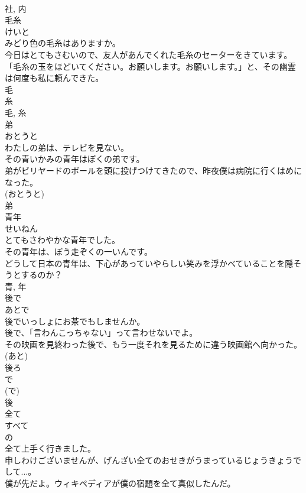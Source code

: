 \documentclass[8pt]{extreport}
\begin{document}
\begin{CJK}{UTF8}{min}
\\	社, 内	
\\	毛糸	
\\	けいと	
\\	みどり色の毛糸はありますか。	
\\	今日はとてもさむいので、友人があんでくれた毛糸のセーターをきています。	
\\	「毛糸の玉をほどいてください。お願いします。お願いします。」と、その幽霊は何度も私に頼んできた。	
\\	毛 
\\	糸 
\\	毛, 糸	
\\	弟	
\\	おとうと	
\\	わたしの弟は、テレビを見ない。	
\\	その青いかみの青年はぼくの弟です。	
\\	弟がビリヤードのボールを頭に投げつけてきたので、昨夜僕は病院に行くはめになった。	
\\	(おとうと) 
\\	弟	
\\	青年	
\\	せいねん	
\\	とてもさわやかな青年でした。	
\\	その青年は、ぼう走ぞくの一いんです。	
\\	どうして日本の青年は、下心があっていやらしい笑みを浮かべていることを隠そうとするのか？	
\\	青, 年	
\\	後で	
\\	あとで	
\\	後でいっしょにお茶でもしませんか。	
\\	後で、「言わんこっちゃない」って言わせないでよ。	
\\	その映画を見終わった後で、もう一度それを見るために違う映画館へ向かった。	
\\	(あと) 
\\	後ろ 
\\	で 
\\	(で) 
\\	後	
\\	全て	
\\	すべて	
\\	の 
\\	全て上手く行きました。	
\\	申しわけございませんが、げんざい全てのおせきがうまっているじょうきょうでして...。	
\\	僕が先だよ。ウィキペディアが僕の宿題を全て真似したんだ。	

\end{CJK}
\end{document}
